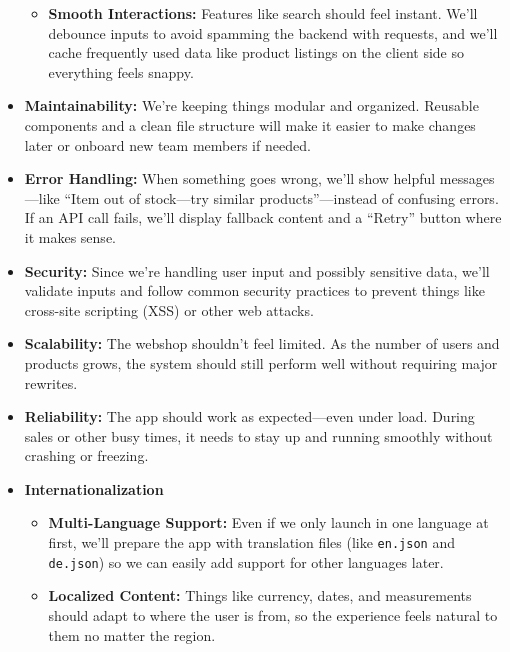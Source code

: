 \documentclass[a4paper,12pt]{article}
\begin{document}
\begin{itemize}
\begin{itemize}
        \item \textbf{Smooth Interactions:}  
        Features like search should feel instant. We'll debounce inputs to avoid spamming the backend with requests, and we’ll cache frequently used data like product listings on the client side so everything feels snappy.
    \end{itemize}

    \item \textbf{Maintainability:}  
    We’re keeping things modular and organized. Reusable components and a clean file structure will make it easier to make changes later or onboard new team members if needed.

    \item \textbf{Error Handling:}  
        When something goes wrong, we’ll show helpful messages—like “Item out of stock—try similar products”—instead of confusing errors. If an API call fails, we’ll display fallback content and a “Retry” button where it makes sense.
    
    \item \textbf{Security:}  
    Since we’re handling user input and possibly sensitive data, we’ll validate inputs and follow common security practices to prevent things like cross-site scripting (XSS) or other web attacks.

    \item \textbf{Scalability:}  
    The webshop shouldn’t feel limited. As the number of users and products grows, the system should still perform well without requiring major rewrites.

    \item \textbf{Reliability:}  
    The app should work as expected—even under load. During sales or other busy times, it needs to stay up and running smoothly without crashing or freezing.

    \item \textbf{Internationalization}
    \begin{itemize}
        \item \textbf{Multi-Language Support:}  
        Even if we only launch in one language at first, we’ll prepare the app with translation files (like \texttt{en.json} and \texttt{de.json}) so we can easily add support for other languages later.

        \item \textbf{Localized Content:}  
        Things like currency, dates, and measurements should adapt to where the user is from, so the experience feels natural to them no matter the region.
    \end{itemize}
\end{itemize}
	
\end{document}
